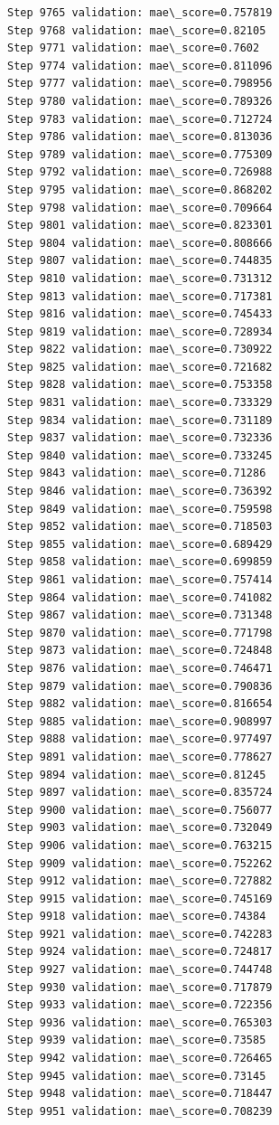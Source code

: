 \documentclass[11pt]{article}
\begin{document}
\begin{Verbatim}[commandchars=\\\{\}]
Step 9765 validation: mae\_score=0.757819
Step 9768 validation: mae\_score=0.82105
Step 9771 validation: mae\_score=0.7602
Step 9774 validation: mae\_score=0.811096
Step 9777 validation: mae\_score=0.798956
Step 9780 validation: mae\_score=0.789326
Step 9783 validation: mae\_score=0.712724
Step 9786 validation: mae\_score=0.813036
Step 9789 validation: mae\_score=0.775309
Step 9792 validation: mae\_score=0.726988
Step 9795 validation: mae\_score=0.868202
Step 9798 validation: mae\_score=0.709664
Step 9801 validation: mae\_score=0.823301
Step 9804 validation: mae\_score=0.808666
Step 9807 validation: mae\_score=0.744835
Step 9810 validation: mae\_score=0.731312
Step 9813 validation: mae\_score=0.717381
Step 9816 validation: mae\_score=0.745433
Step 9819 validation: mae\_score=0.728934
Step 9822 validation: mae\_score=0.730922
Step 9825 validation: mae\_score=0.721682
Step 9828 validation: mae\_score=0.753358
Step 9831 validation: mae\_score=0.733329
Step 9834 validation: mae\_score=0.731189
Step 9837 validation: mae\_score=0.732336
Step 9840 validation: mae\_score=0.733245
Step 9843 validation: mae\_score=0.71286
Step 9846 validation: mae\_score=0.736392
Step 9849 validation: mae\_score=0.759598
Step 9852 validation: mae\_score=0.718503
Step 9855 validation: mae\_score=0.689429
Step 9858 validation: mae\_score=0.699859
Step 9861 validation: mae\_score=0.757414
Step 9864 validation: mae\_score=0.741082
Step 9867 validation: mae\_score=0.731348
Step 9870 validation: mae\_score=0.771798
Step 9873 validation: mae\_score=0.724848
Step 9876 validation: mae\_score=0.746471
Step 9879 validation: mae\_score=0.790836
Step 9882 validation: mae\_score=0.816654
Step 9885 validation: mae\_score=0.908997
Step 9888 validation: mae\_score=0.977497
Step 9891 validation: mae\_score=0.778627
Step 9894 validation: mae\_score=0.81245
Step 9897 validation: mae\_score=0.835724
Step 9900 validation: mae\_score=0.756077
Step 9903 validation: mae\_score=0.732049
Step 9906 validation: mae\_score=0.763215
Step 9909 validation: mae\_score=0.752262
Step 9912 validation: mae\_score=0.727882
Step 9915 validation: mae\_score=0.745169
Step 9918 validation: mae\_score=0.74384
Step 9921 validation: mae\_score=0.742283
Step 9924 validation: mae\_score=0.724817
Step 9927 validation: mae\_score=0.744748
Step 9930 validation: mae\_score=0.717879
Step 9933 validation: mae\_score=0.722356
Step 9936 validation: mae\_score=0.765303
Step 9939 validation: mae\_score=0.73585
Step 9942 validation: mae\_score=0.726465
Step 9945 validation: mae\_score=0.73145
Step 9948 validation: mae\_score=0.718447
Step 9951 validation: mae\_score=0.708239

\end{Verbatim}
\end{document}
